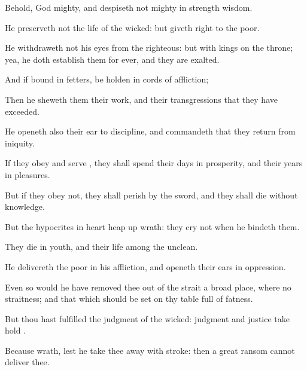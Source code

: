 {\par }{\PP {}Behold,
God
{}
mighty, and
despiseth not
{}
mighty in
strength
{}
wisdom.

He preserveth not the
life of the
wicked: but
giveth
right to the
poor.

He
withdraweth not his
eyes from the
righteous: but with
kings
{} on the
throne; yea, he doth
establish them for
ever, and they are
exalted.

And if
{}
bound in
fetters,
{} be
holden in
cords of
affliction;

Then he
sheweth them their
work, and their
transgressions that they have
exceeded.

He
openeth also their
ear to
discipline, and
commandeth that they
return from
iniquity.

If they
obey and
serve
{}, they shall
spend their
days in
prosperity, and their
years in
pleasures.

But if they
obey not, they shall
perish by the
sword, and they shall
die without
knowledge.

But the
hypocrites in
heart heap
up
wrath: they
cry not when he
bindeth them.

They
die in
youth, and their
life
{} among the
unclean.


\par }{\PP {}He
delivereth the
poor in his
affliction, and
openeth their
ears in
oppression.

Even so would he have
removed thee out of the
strait
{} a broad
place,
where
{} no
straitness; and that which should be
set on thy
table
{}
full of
fatness.

But thou hast
fulfilled the
judgment of the
wicked:
judgment and
justice take
hold
{}.

Because
{}
wrath,
{} lest he take thee
away with
{}
stroke: then a
great
ransom cannot
deliver thee.

}
